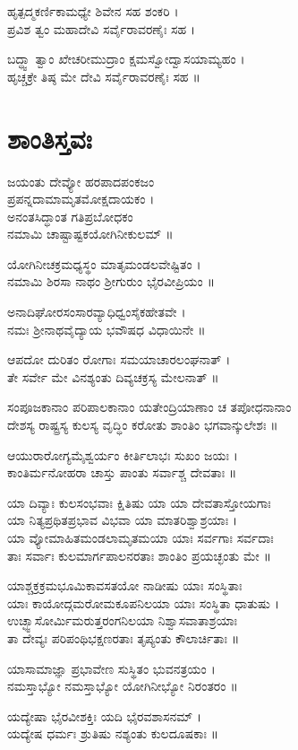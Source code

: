 ಹೃತ್ಪದ್ಮಕರ್ಣಿಕಾಮಧ್ಯೇ ಶಿವೇನ ಸಹ ಶಂಕರಿ ।\\ ಪ್ರವಿಶ ತ್ವಂ ಮಹಾದೇವಿ ಸರ್ವೈರಾವರಣೈಃ ಸಹ ।

ಬದ್ಧ್ವಾ ತ್ವಾಂ ಖೇಚರೀಮುದ್ರಾಂ ಕ್ಷಮಸ್ವೋದ್ವಾಸಯಾಮ್ಯಹಂ ।\\ ಹೃಚ್ಚಕ್ರೇ ತಿಷ್ಠ ಮೇ ದೇವಿ ಸರ್ವೈರಾವರಣೈಃ ಸಹ ॥


\section{ಶಾಂತಿಸ್ತವಃ}
ಜಯಂತು ದೇವ್ಯೋ ಹರಪಾದಪಂಕಜಂ \\
ಪ್ರಪನ್ನದಾಮಾಮೃತಮೋಕ್ಷದಾಯಕಂ ।\\
ಅನಂತಸಿದ್ಧಾಂತ ಗತಿಪ್ರಬೋಧಕಂ\\
ನಮಾಮಿ ಚಾಷ್ಟಾಷ್ಟಕಯೋಗಿನೀಕುಲಮ್ ॥

ಯೋಗಿನೀಚಕ್ರಮಧ್ಯಸ್ಥಂ ಮಾತೃಮಂಡಲವೇಷ್ಟಿತಂ ।\\
ನಮಾಮಿ ಶಿರಸಾ ನಾಥಂ ಶ್ರೀಗುರುಂ ಭೈರವೀಪ್ರಿಯಂ ॥

ಅನಾದಿಘೋರಸಂಸಾರವ್ಯಾಧಿಧ್ವಂಸೈಕಹೇತವೇ ।\\
ನಮಃ ಶ್ರೀನಾಥವೈದ್ಯಾಯ ಭವೌಷಧ ವಿಧಾಯಿನೇ ॥

ಆಪದೋ ದುರಿತಂ ರೋಗಾಃ ಸಮಯಾಚಾರಲಂಘನಾತ್ ।\\
ತೇ ಸರ್ವೇ ಮೇ ವಿನಶ್ಯಂತು ದಿವ್ಯಚಕ್ರಸ್ಯ ಮೇಲನಾತ್ ॥

ಸಂಪೂಜಕಾನಾಂ ಪರಿಪಾಲಕಾನಾಂ ಯತೇಂದ್ರಿಯಾಣಾಂ ಚ ತಪೋಧನಾನಾಂ\\
ದೇಶಸ್ಯ ರಾಷ್ಟ್ರಸ್ಯ ಕುಲಸ್ಯ ವೃದ್ಧಿಂ ಕರೋತು ಶಾಂತಿಂ ಭಗವಾನ್ಕುಲೇಶಃ ॥

ಆಯುರಾರೋಗ್ಯಮೈಶ್ವರ್ಯಂ ಕೀರ್ತಿಲಾಭಃ ಸುಖಂ ಜಯಃ ।\\
ಕಾಂತಿರ್ಮನೋಹರಾ ಚಾಸ್ತು ಪಾಂತು ಸರ್ವಾಶ್ಚ ದೇವತಾಃ ॥

ಯಾ ದಿವ್ಯಾಃ ಕುಲಸಂಭವಾಃ ಕ್ಷಿತಿಷು ಯಾ ಯಾ ದೇವತಾಸ್ತೋಯಗಾಃ\\
ಯಾ ನಿತ್ಯಪ್ರಥಿತಪ್ರಭಾವ ವಿಭವಾ ಯಾ ಮಾತರಿಶ್ವಾಶ್ರಯಾಃ ।\\
ಯಾ ವ್ಯೋಮಾಹಿತಮಂಡಲಾಮೃತಮಯಾ ಯಾಃ ಸರ್ವಗಾಃ ಸರ್ವದಾಃ\\
ತಾಃ ಸರ್ವಾಃ ಕುಲಮಾರ್ಗಪಾಲನರತಾಃ ಶಾಂತಿಂ ಪ್ರಯಚ್ಛಂತು ಮೇ ॥

ಯಾಶ್ಚಕ್ರಕ್ರಮಭೂಮಿಕಾವಸತಯೋ ನಾಡೀಷು ಯಾಃ ಸಂಸ್ಥಿತಾಃ\\
ಯಾಃ ಕಾಯೋದ್ಗಮರೋಮಕೂಪನಿಲಯಾ ಯಾಃ ಸಂಸ್ಥಿತಾ ಧಾತುಷು ।\\
ಉಚ್ಛ್ವಾಸೋರ್ಮಿಮರುತ್ತರಂಗನಿಲಯಾ ನಿಶ್ವಾಸವಾತಾಶ್ರಯಾಃ \\
ತಾ ದೇವ್ಯಃ ಪರಿಪಂಥಿಭಕ್ಷಣರತಾಃ ತೃಪ್ಯಂತು ಕೌಲಾರ್ಚಿತಾಃ ॥

ಯಾಸಾಮಾಜ್ಞಾ ಪ್ರಭಾವೇಣ ಸುಸ್ಥಿತಂ ಭುವನತ್ರಯಂ ।\\
ನಮಸ್ತಾಭ್ಯೋ ನಮಸ್ತಾಭ್ಯೋ ಯೋಗಿನೀಭ್ಯೋ ನಿರಂತರಂ ॥

ಯದ್ಯೇಷಾ ಭೈರವೀಶಕ್ತಿಃ ಯದಿ ಭೈರವಶಾಸನಮ್ ।\\
ಯದ್ಯೇಷ ಧರ್ಮಃ ಶ್ರುತಿಷು ನಶ್ಯಂತು ಕುಲದೂಷಕಾಃ ॥

